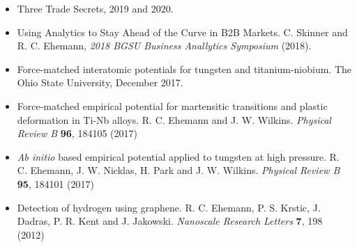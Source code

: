 \documentclass[9pt]{developercv} %
\begin{document}
\begin{entrylist}
	\entry
		{}
		{}
		{}
		{%
\vspace{-2\baselineskip}
\renewcommand{\labelitemi}{\textcolor{gray}{$\blacksquare$}}
\begin{itemize}
\setlength{\itemindent}{-1cm}
\item Three Trade Secrets, 2019 and 2020.
\item Using Analytics to Stay Ahead of the Curve in B2B Markets. C. Skinner and R. C. Ehemann, \emph{2018 BGSU Business Anallytics Symposium} (2018).
\item Force-matched interatomic potentials for tungsten and titanium-niobium. The Ohio State University, December 2017.
\item Force-matched empirical potential for martensitic transitions and plastic deformation in Ti-Nb alloys. R. C. Ehemann and J. W. Wilkins. {\emph{Physical Review B}} {\bf{96}}, 184105 (2017)
\item {\emph{Ab initio}} based empirical potential applied to tungsten at high pressure. R. C. Ehemann, J. W. Nicklas, H. Park and J. W. Wilkins. {\emph{Physical Review B}} {\bf{95}}, 184101 (2017)
\item Detection of hydrogen using graphene. R. C. Ehemann, P. S. Krstic, J. Dadras, P. R. Kent and J. Jakowski. {\emph{Nanoscale Research Letters}} {\bf{7}}, 198 (2012)
\end{itemize}}
\end{entrylist}

\begin{entrylist}
\end{entrylist}
\end{document}
